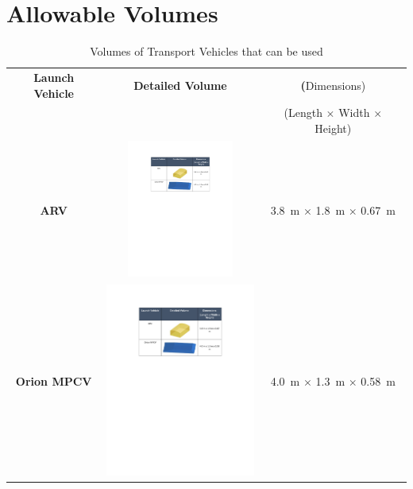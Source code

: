 \documentclass[12pt, letter]{article}
\begin{document}
\section{Allowable Volumes}
\label{volumes}
\begin{table}[H]
\caption{Volumes of Transport Vehicles that can be used\cite{RFP}}
\centering
\begin{tabular}{|c|c|c|}
\hline
\textbf{Launch Vehicle}	&	\textbf{Detailed Volume}				&	\textbf(Dimensions)	\\
				&										&	(Length $\times$ Width $\times$ Height)	\\\hhline{|=|=|=|}
\textbf{ARV}		&	\begin{minipage}{5.5cm}
					\centering
					\vspace{2px}
					\includegraphics[width=3.5cm]{ARV_step}	
					\end{minipage}							&	\SI{3.8}{\m} $\times$ \SI{1.8}{\m} $\times$ \SI{0.67}{\m}	\\\hline
\textbf{Orion MPCV}	&	\begin{minipage}{5.5cm}
					\centering
					\vspace{2px}
					\includegraphics[width=5cm]{MPCV_step}	
					\end{minipage}							&	\SI{4.0}{\m} $\times$ \SI{1.3}{\m} $\times$ \SI{0.58}{\m}	\\\hline
\end{tabular}
\end{table}
\end{document}
